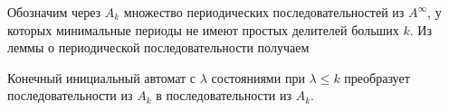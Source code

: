 Обозначим через $A_k$ множество периодических последовательностей из $A^{\infty}$, у которых минимальные периоды не имеют простых делителей больших $k$. Из леммы о периодической последовательности получаем

\begin{corollary}
    Конечный инициальный автомат с $\lambda$ состояниями при $\lambda \leqslant k$ преобразует последовательности из $A_k$ в последовательности из $A_k$.
\end{corollary}